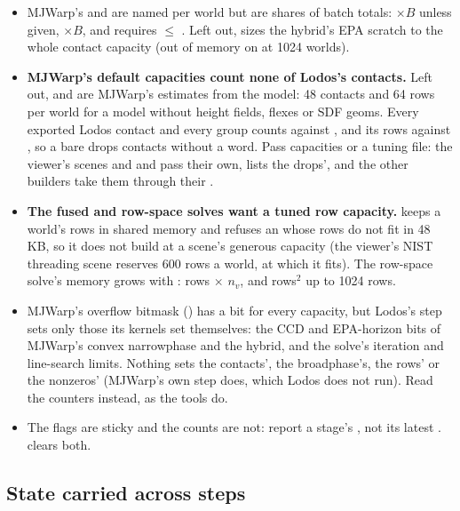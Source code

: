 \begin{itemize}
\item MJWarp's  and  are named per world but are shares of batch totals:  $\times B$ unless given,  $\times B$, and  requires  $\le$ . Left out,  sizes the hybrid's EPA scratch to the whole contact capacity (out of memory on  at 1024 worlds).
\item \textbf{MJWarp's default capacities count none of Lodos's contacts.} Left out,  and  are MJWarp's estimates from the model: 48 contacts and 64 rows per world for a model without height fields, flexes or SDF geoms. Every exported Lodos contact and every group counts against , and its rows against , so a bare  drops contacts without a word. Pass capacities or a tuning file: the viewer's scenes and  and  pass their own,  lists the drops', and the other builders take them through their .
\item \textbf{The fused and row-space solves want a tuned row capacity.}  keeps a world's rows in shared memory and refuses an  whose rows do not fit in 48\,KB, so it does not build at a scene's generous capacity (the viewer's NIST threading scene reserves 600 rows a world, at which it fits). The row-space solve's memory grows with : rows $\times$ $n_v$, and rows$^2$ up to 1024 rows.
\item MJWarp's overflow bitmask () has a bit for every capacity, but Lodos's step sets only those its kernels set themselves: the CCD and EPA-horizon bits of MJWarp's convex narrowphase and the hybrid, and the solve's iteration and line-search limits. Nothing sets the contacts', the broadphase's, the rows' or the nonzeros' (MJWarp's own step does, which Lodos does not run). Read the counters instead, as the tools do.
\item The flags are sticky and the counts are not: report a stage's , not its latest .  clears both.
\end{itemize}

\subsection{State carried across steps}\label{sec:carried}

